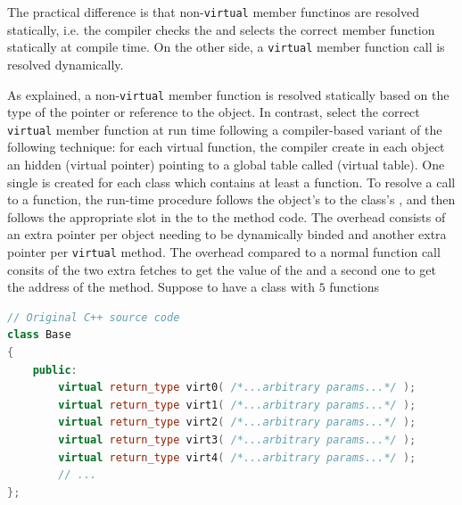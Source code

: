The practical difference is that non-\texttt{virtual} member functinos 
are resolved statically, i.e. the compiler checks the 
 and selects 
the correct member function statically at compile time.
\newline
On the other side, a \texttt{virtual} member function call is resolved 
dynamically.

As explained, a non-\texttt{virtual} member function is resolved 
statically based on the type of the pointer or reference to the object.
\newline
In contrast,  select the correct 
\texttt{virtual} member function at run time following a compiler-based 
variant of the following technique: for each virtual function, the 
compiler create in each object an hidden  
(virtual pointer) pointing to a global table called  
(virtual table). One single  is created for each class
which contains at least a  function.
\newline
To resolve a call to a  function, the run-time procedure 
follows the object's  to the class's , 
and then follows the appropriate slot in the  to the 
method code.
\newline
The  overhead consists of an extra pointer per object 
needing to be dynamically binded and another extra pointer per 
\texttt{virtual} method. The  overhead compared to 
a normal function call consits of the two extra fetches to get the 
value of the  and a second one to get the address of  
the method.
\newline
Suppose to have a  class with $5$  
functions
\begin{lstlisting}[language=C++]
// Original C++ source code
class Base
{
    public:
        virtual return_type virt0( /*...arbitrary params...*/ );
        virtual return_type virt1( /*...arbitrary params...*/ );
        virtual return_type virt2( /*...arbitrary params...*/ );
        virtual return_type virt3( /*...arbitrary params...*/ );
        virtual return_type virt4( /*...arbitrary params...*/ );
        // ...
};
\end{lstlisting}

